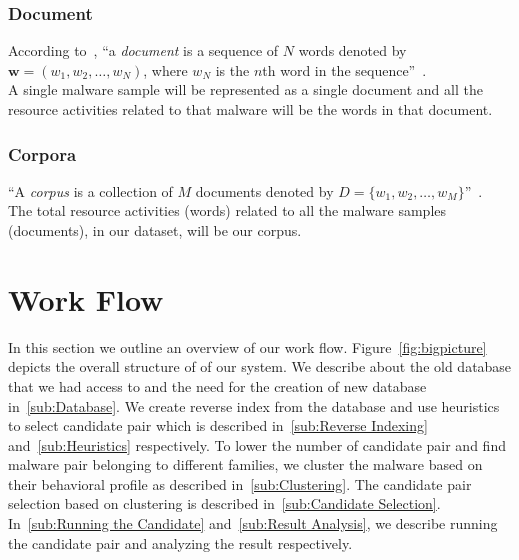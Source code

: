 \subsubsection{Document}
According to~\citeauthor{Blei}, ``a \emph{document} is a sequence of $N$ words denoted by $\textbf{w} = (w_1,w_2,\ldots,w_N)$, where $w_N$ is the $n$th word in the sequence''~\cite[]{Blei}.\\
A single malware sample will be represented as a single document and all the resource activities related to that malware will be the words in that document.
\label{ssub:Document}
\subsubsection{Corpora}
\label{ssub:Corpora}
``A \emph{corpus} is a collection of $M$ documents denoted by $D = \{w_1,w_2,\ldots,w_M\}$''~\cite[]{Blei}.\\
The total resource activities (words) related to all the malware samples (documents), in our dataset, will be our corpus.\\

\section{Work Flow}
\label{sec:Work Flow}
In this section we outline an overview of our work flow.
Figure~\ref{fig:bigpicture} depicts the overall structure of of our system.
We describe about the old database that we had access to and the need for the creation of new database in~\autoref{sub:Database}.
We create reverse index from the database and use heuristics to select candidate pair which is described in~\autoref{sub:Reverse Indexing} and~\autoref{sub:Heuristics} respectively.
To lower the number of candidate pair and find malware pair belonging to different families, we cluster the malware based on their behavioral profile as described in~\autoref{sub:Clustering}.
The candidate pair selection based on clustering is described in~\autoref{sub:Candidate Selection}.
In~\autoref{sub:Running the Candidate} and~\autoref{sub:Result Analysis}, we describe running the candidate pair and analyzing the result respectively.
